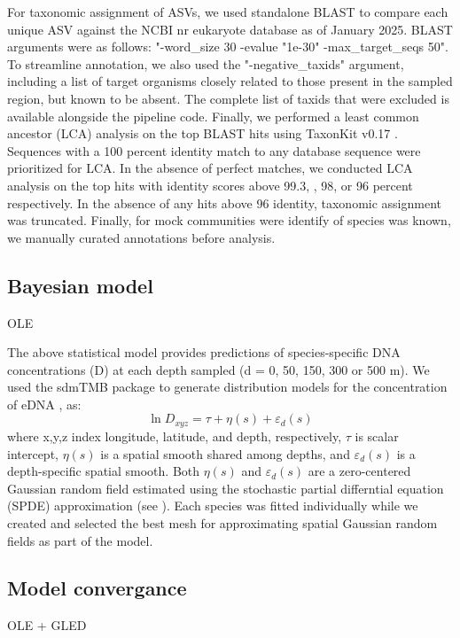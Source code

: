 \documentclass[9pt,twoside,lineno]{pnas-SI}
\begin{document}
For taxonomic assignment of ASVs, we used standalone BLAST \cite{altschul1990} to compare each unique ASV against the NCBI nr eukaryote database as of January 2025. BLAST arguments were as follows: "-word\_size 30 -evalue "1e-30" -max\_target\_seqs 50". To streamline annotation, we also used the "-negative\_taxids" argument, including a list of target organisms closely related to those present in the sampled region, but known to be absent. The complete list of taxids that were excluded is available alongside the pipeline code. Finally, we performed a least common ancestor (LCA) analysis on the top BLAST hits using TaxonKit v0.17 \cite{shen2021}. Sequences with a 100 percent identity match to any database sequence were prioritized for LCA. In the absence of perfect matches, we conducted LCA analysis on the top hits with identity scores above 99.3, , 98, or 96 percent respectively. In the absence of any hits above 96 identity, taxonomic assignment was truncated. Finally, for mock communities were identify of species was known, we manually curated annotations before analysis. 

\subsection*{Bayesian model}
OLE

The above statistical model provides predictions of species-specific DNA concentrations (D) at each depth sampled (d = 0, 50, 150, 300 or 500 m). We used the sdmTMB package \cite{anderson2022} to generate distribution models for the concentration of eDNA , as:
$$\ln D_{xyz} = \tau + \eta(s) + \varepsilon_{d}(s)$$
where x,y,z index longitude, latitude, and depth, respectively, $\tau$ is scalar intercept, $\eta(s)$ is a spatial smooth shared among depths, and $\varepsilon_d(s)$ is a depth-specific spatial smooth. Both $\eta(s)$ and $\varepsilon_d(s)$ are a zero-centered Gaussian random field estimated using the stochastic partial differntial equation (SPDE) approximation (see \cite{anderson2022}). Each species was fitted individually while we created and selected the best mesh for approximating spatial Gaussian random fields as part of the model.

\subsection*{Model convergance}
OLE + GLED
\end{document}
